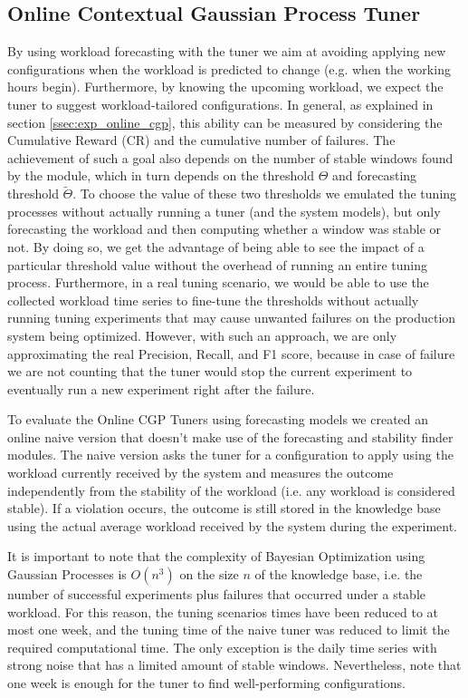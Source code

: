 \documentclass[a4paper, 12pt]{article} %
\begin{document}
	
	
	\subsection{Online Contextual Gaussian Process Tuner} \label{ssec:results_online_cgp_tuner}
	By using workload forecasting with the tuner we aim at avoiding applying new configurations when the workload is predicted to change (e.g. when the working hours begin). Furthermore, by knowing the upcoming workload, we expect the tuner to suggest workload-tailored configurations. In general, as explained in section \ref{ssec:exp_online_cgp}, this ability can be measured by considering the Cumulative Reward (CR) and the cumulative number of failures.
	The achievement of such a goal also depends on the number of stable windows found by the module, which in turn depends on the threshold $\Theta$ and forecasting threshold $\tilde{\Theta}$. To choose the value of these two thresholds we emulated the tuning processes without actually running a tuner (and the system models), but only forecasting the workload and then computing whether a window was stable or not. By doing so, we get the advantage of being able to see the impact of a particular threshold value without the overhead of running an entire tuning process. Furthermore, in a real tuning scenario, we would be able to use the collected workload time series to fine-tune the thresholds without actually running tuning experiments that may cause unwanted failures on the production system being optimized. However, with such an approach, we are only approximating the real Precision, Recall, and F1 score, because in case of failure we are not counting that the tuner would stop the current experiment to eventually run a new experiment right after the failure.
	
	To evaluate the Online CGP Tuners using forecasting models we created an online naive version that doesn't make use of the forecasting and stability finder modules. The naive version asks the tuner for a configuration to apply using the workload currently received by the system and measures the outcome independently from the stability of the workload (i.e. any workload is considered stable). If a violation occurs, the outcome is still stored in the knowledge base using the actual average workload received by the system during the experiment.
	
	It is important to note that the complexity of Bayesian Optimization using Gaussian Processes is $O(n^3)$ on the size $n$ of the knowledge base, i.e. the number of successful experiments plus failures that occurred under a stable workload. For this reason, the tuning scenarios times have been reduced to at most one week, and the tuning time of the naive tuner was reduced to limit the required computational time. The only exception is the daily time series with strong noise that has a limited amount of stable windows. Nevertheless, note that one week is enough for the tuner to find well-performing configurations. 
	
\end{document}
